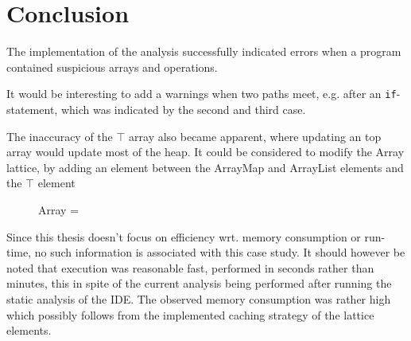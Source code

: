\section{Conclusion}

The implementation of the analysis successfully indicated errors when a program contained suspicious arrays and operations. 

It would be interesting to add a warnings when two paths meet, e.g. after an \texttt{if}-statement, which was indicated by the second and third case. 

The inaccuracy of the $\top$ array also became apparent, where updating an top array would update most of the heap. It could be considered to modify the Array lattice, by adding an element between the ArrayMap and ArrayList elements and the $\top$ element

\begin{figure}
\centering
Array = 
\end{figure}

Since this thesis doesn't focus on efficiency wrt. memory consumption or run-time, no such information is associated with this case study. It should however be noted that execution was reasonable fast, performed in seconds rather than minutes, this in spite of the current analysis being performed after running the static analysis of the IDE. The observed memory consumption was rather high which possibly follows from the implemented caching strategy of the lattice elements.  

